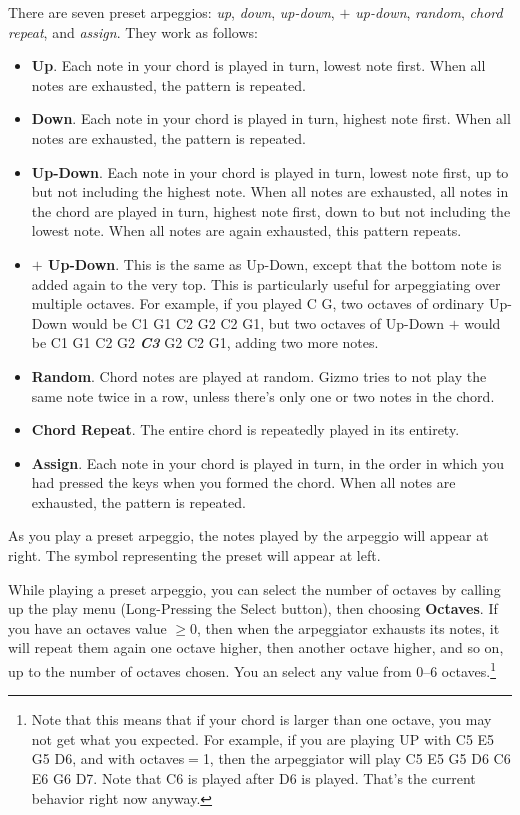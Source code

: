 \documentclass{article}
\begin{document}
There are seven preset arpeggios: {\it up}, {\it down}, {\it up-down}, {\it  \(+\) up-down}, {\it random}, {\it chord repeat}, and {\it assign}.  They work as follows:

\begin{itemize}
\item {\bf Up}.  Each note in your chord is played in turn, lowest note first.  When all notes are exhausted, the pattern is repeated.
\item {\bf Down}.  Each note in your chord is played in turn, highest note first.  When all notes are exhausted, the pattern is repeated.
\item {\bf Up-Down}.  Each note in your chord is played in turn, lowest note first, up to but not including the highest note.  When all notes are exhausted, all notes in the chord are played in turn, highest note first, down to but not including the lowest note.  When all notes are again exhausted, this pattern repeats.
\item {\bf  \(\bm{+}\) Up-Down}.  This is the same as Up-Down, except that the bottom note is added again to the very top.  This is particularly useful for arpeggiating over multiple octaves.  For example, if you played C G, two octaves of ordinary Up-Down would be C1 G1 C2 G2 C2 G1, but two octaves of Up-Down \(+\) would be C1 G1 C2 G2 \textit{\textbf{C3}} G2 C2 G1, adding two more notes.  
\item {\bf Random}.  Chord notes are played at random.  Gizmo tries to not play the same note twice in a row, unless there's only one or two notes in the chord.
\item {\bf Chord Repeat}.  The entire chord is repeatedly played in its entirety.
\item {\bf Assign}. Each note in your chord is played in turn, in the order in which you had pressed the keys when you formed the chord.  When all notes are exhausted, the pattern is repeated.
\end{itemize}

As you play a preset arpeggio, the notes played by the arpeggio will appear at right.  The symbol representing the preset will appear at left.

While playing a preset arpeggio, you can select the number of octaves by calling up the play menu (Long-Pressing the Select button), then choosing {\bf Octaves}.  If you have an octaves value \(\geq 0\), then when the arpeggiator exhausts its notes, it will repeat them again one octave higher, then another octave higher, and so on, up to the number of octaves chosen. You an select any value from 0--6 octaves.\footnote{Note that this means that if your chord is larger than one octave, you may not get what you expected.  For example, if you are playing UP with C5 E5 G5 D6, and with octaves\(=\)1, then the arpeggiator will play C5 E5 G5 D6 C6 E6 G6 D7.  Note that C6 is played after D6 is played.  That's the current behavior right now anyway.}
\end{document}
